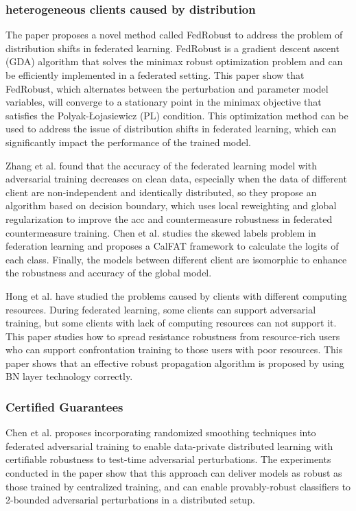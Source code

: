 \documentclass[conference]{IEEEtran}
\begin{document}
\subsubsection{heterogeneous clients caused by distribution}
The paper\cite{b101} proposes a novel method called FedRobust to address the problem of
distribution shifts in federated learning. FedRobust is a gradient descent ascent
(GDA) algorithm that solves the minimax robust optimization problem and can be
efficiently implemented in a federated setting. This paper show that FedRobust,
which alternates between the perturbation and parameter model variables,
will converge to a stationary point in the minimax objective that satisfies
the Polyak-Łojasiewicz (PL) \cite{b102} condition. This optimization method can be used
to address the issue of distribution shifts in federated learning,
which can significantly impact the performance of the trained model.

Zhang et al.\cite{b34} found that the accuracy of the federated learning model with
adversarial training decreases on clean data, especially when the data of different
client are non-independent and identically distributed, so they propose an algorithm
based on decision boundary, which uses local reweighting and global regularization
to improve the acc and countermeasure robustness in federated countermeasure training.
Chen et al.\cite{b32} studies the skewed labels problem in federation learning and proposes
a CalFAT framework to calculate the logits of each class. Finally, the models between different
client are isomorphic to enhance the robustness and accuracy of the global model.

Hong et al.\cite{b105} have studied the problems caused by clients with different computing resources.
During federated learning, some clients can support adversarial training, but some clients with
lack of computing resources can not support it. This paper studies how to spread resistance robustness
from resource-rich users who can support confrontation training to those users with poor resources.
This paper shows that an effective robust propagation algorithm is proposed by using BN layer technology correctly.
\subsubsection{Certified Guarantees}
Chen et al.\cite{b104} proposes incorporating randomized smoothing techniques into federated adversarial
training to enable data-private distributed learning with certifiable robustness to test-time adversarial
perturbations. The experiments conducted in the paper show that this approach can deliver models as
robust as those trained by centralized training, and can enable provably-robust classifiers to
2-bounded adversarial perturbations in a distributed setup.
\end{document}
